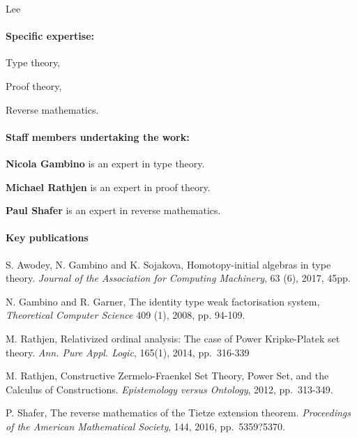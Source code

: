 \begin{sitedescription}{Lee}
\paragraph{Specific expertise:}

\begin{compactitem}
\item Type theory,
\item Proof theory,
\item Reverse mathematics.
\end{compactitem}

\paragraph{Staff members undertaking the work:}

\begin{compactitem}
\item \textbf{Nicola Gambino} is an expert in type theory.
\item \textbf{Michael Rathjen} is an expert in proof theory.
\item \textbf{Paul Shafer} is an expert in reverse mathematics.
\end{compactitem}


\paragraph{Key publications} 

\begin{compactitem}
\item S. Awodey, N. Gambino and K. Sojakova, Homotopy-initial algebras in type theory. 
{\em Journal of the Association for Computing Machinery}, 63 (6), 2017, 45pp.
\item N. Gambino and R. Garner, The identity type weak factorisation system, 
{\em Theoretical Computer Science} 409 (1), 2008, pp. 94-109.
\item M. Rathjen, Relativized ordinal analysis: The case of Power Kripke-Platek set theory. 
{\em Ann. Pure Appl. Logic}, 165(1), 2014, pp.~316-339 
\item M. Rathjen,
Constructive Zermelo-Fraenkel Set Theory, Power Set, and the Calculus of Constructions. 
{\em Epistemology versus Ontology}, 2012, pp.~313-349. 
\item P. Shafer,
The reverse mathematics of the Tietze extension theorem.  
{\em Proceedings of the American Mathematical Society}, 144, 2016, pp.~5359?5370.
\end{compactitem}

\end{sitedescription}

